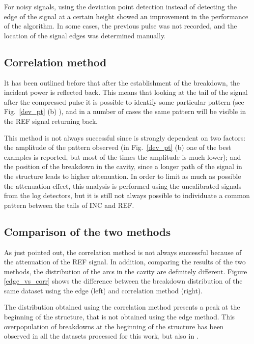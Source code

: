 For noisy signals, using the deviation point detection instead of detecting the edge of the signal at a certain height showed an improvement in the performance of the algorithm. In some cases, the previous pulse was not recorded, and the location of the signal edges was determined manually.

\subsection[Correlation method]{Correlation method}

It has been outlined before that after the establishment of the breakdown, the incident power is reflected back. This means that looking at the tail of the signal after the compressed pulse it is possible to identify some particular pattern (see Fig.~\ref{dev_pt} (b) ), and in a number of cases the same pattern will be visible in the REF signal returning back. 

This method is not always successful since is strongly dependent on two factors: the amplitude of the pattern observed (in Fig.~\ref{dev_pt} (b) one of the best examples is reported, but most of the times the amplitude is much lower); and the position of the breakdown in the cavity, since a longer path of the signal in the structure leads to higher attenuation. In order to limit as much as possible the attenuation effect, this analysis is performed using the uncalibrated signals from the log detectors, but it is still not always possible to individuate a common pattern between the tails of INC and REF.


\subsection[Comparison of the two methods]{Comparison of the two methods} 
As just pointed out, the correlation method is not always successful because of the attenuation of the REF signal. In addition, comparing the results of the two methods, the distribution of the arcs in the cavity are definitely different. Figure \ref{edge_vs_corr} shows the difference between the breakdown distribution of the same dataset using the edge (left) and correlation method (right). 

The distribution obtained using the correlation method presents a peak at the beginning of the structure, that is not obtained using the edge method. This overpopulation of breakdowns at the beginning of the structure has been observed in all the datasets processed for this work, but also in \cite{Rajamaki:2143815}.  

